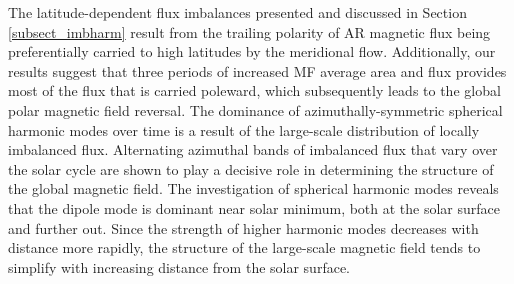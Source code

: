\documentclass[namedreferences]{solarphysics}
\begin{document}
\begin{article}
The latitude-dependent flux imbalances presented and discussed in Section\,\ref{subsect_imbharm} result from the trailing polarity of AR magnetic flux being preferentially carried to high latitudes by the meridional flow. Additionally, our results suggest that three periods of increased MF average area and flux provides most of the flux that is carried poleward, which subsequently leads to the global polar magnetic field reversal. The dominance of azimuthally-symmetric spherical harmonic modes over time is a result of the large-scale distribution of locally imbalanced flux. Alternating azimuthal bands of imbalanced flux that vary over the solar cycle are shown to play a decisive role in determining the structure of the global magnetic field. The investigation of spherical harmonic modes reveals that the dipole mode is dominant near solar minimum, both at the solar surface and further out. Since the strength of higher harmonic modes decreases with distance more rapidly, the structure of the large-scale magnetic field tends to simplify with increasing distance from the solar surface.



\end{article}
\end{document}
